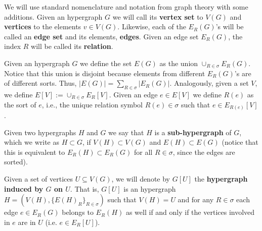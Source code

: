 \documentclass[12pt,notitlepage,a4paper]{article}
\theoremstyle{definition}
\begin{document}
We will use standard nomenclature and notation
from graph theory with some additions. Given an 
hypergraph $G$ we will call its \textbf{vertex set} to $V(G)$ 
and \textbf{vertices} 
to the elements $v\in V(G)$. Likewise, each of 
the $E_R(G)$'s will be called an \textbf{edge set} and its elements, 
\textbf{edges}. Given an edge set $E_R(G)$, 
the index $R$ will be called its \textbf{relation}. 

\par
Given an hypergraph $G$ we define the set $E(G)$ as the
union $\cup_{R\in \sigma}E_R(G)$. Notice that this union 
is disjoint because elements from different $E_R(G)$'s 
are of different sorts. Thus, $|E(G)|=\sum_{R\in \sigma} 
|E_R(G)|$. Analogously, given a set $V$, we define
$E[V]:=\cup_{R\in \sigma} E_R[V]$.
Given an edge $e\in E[V]$ we define $R(e)$
as the sort of $e$, i.e.,
the unique relation symbol $R(e)\in \sigma$
such that $e\in E_{R(e)}[V]$.

Given two hypergraphs $H$ and $G$ we say that $H$
is a \textbf{sub-hypergraph} of $G$, which we write as $H\subset G$,
if $V(H)\subset V(G)$ and $E(H)\subset E(G)$ (notice 
that this is equivalent to $E_R(H)\subset E_R(G)$ for all
$R\in \sigma$, since the edges are sorted).\par


Given a set of vertices $U\subseteq V(G)$, 
we will denote by $G[U]$ the \textbf{hypergraph induced
by $G$ on $U$}. That is, $G[U]$ is an hypergraph
$H=(V(H),\{E(H)_R\}_{R\in \sigma})$ such that 
$V(H)=U$ and for any $R\in \sigma$ 
each edge $e\in E_R(G)$ belongs 
to $E_R(H)$ as well if and only if the vertices
involved in $e$ are in $U$ (i.e. $e\in E_R[U]$).
\par
%
%

%
\end{document}
